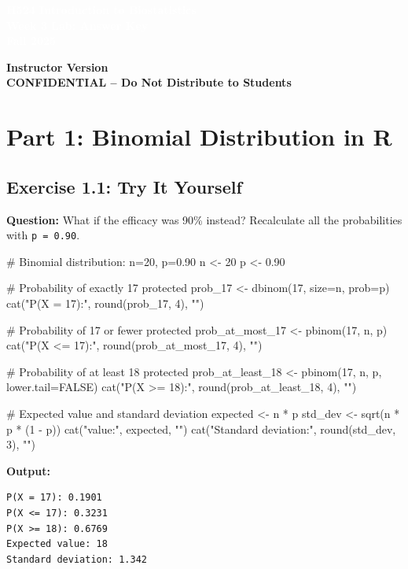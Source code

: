 \documentclass[11pt]{article}
\title{}
\author{}
\date{}
\begin{document}
\begin{tcolorbox}[colback=osaorange,colframe=black,boxrule=2pt,arc=0pt,left=3pt,right=3pt,top=6pt,bottom=6pt,boxsep=2pt]
\centering
\textcolor{white}{\textbf{\Large H524 Introduction to Biostatistics}}\\
\textcolor{white}{\textbf{\Large Week 3 Lab: Answer Key}}\\
\textcolor{white}{\textbf{\Large Fall 2025}}
\end{tcolorbox}

\vspace{8pt}

\noindent\textbf{Instructor Version}\\
\textbf{CONFIDENTIAL -- Do Not Distribute to Students}

\section{Part 1: Binomial Distribution in R}

\subsection{Exercise 1.1: Try It Yourself}

\textbf{Question:} What if the efficacy was 90\% instead? Recalculate all the probabilities with \texttt{p = 0.90}.

\begin{rcode}
# Binomial distribution: n=20, p=0.90
n <- 20
p <- 0.90

# Probability of exactly 17 protected
prob_17 <- dbinom(17, size=n, prob=p)
cat("P(X = 17):", round(prob_17, 4), "\n")

# Probability of 17 or fewer protected
prob_at_most_17 <- pbinom(17, n, p)
cat("P(X <= 17):", round(prob_at_most_17, 4), "\n")

# Probability of at least 18 protected
prob_at_least_18 <- pbinom(17, n, p, lower.tail=FALSE)
cat("P(X >= 18):", round(prob_at_least_18, 4), "\n")

# Expected value and standard deviation
expected <- n * p
std_dev <- sqrt(n * p * (1 - p))
cat("\nExpected value:", expected, "\n")
cat("Standard deviation:", round(std_dev, 3), "\n")
\end{rcode}

\begin{routput}
\textbf{Output:}
\begin{verbatim}
P(X = 17): 0.1901
P(X <= 17): 0.3231
P(X >= 18): 0.6769
Expected value: 18
Standard deviation: 1.342
\end{verbatim}
\end{routput}
\end{document}

